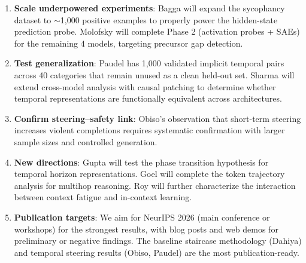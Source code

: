 \documentclass[midterm]{sparreport}
\begin{document}
\begin{enumerate}
  \item \textbf{Scale underpowered experiments}: Bagga will expand the sycophancy dataset to $\sim$1,000 positive examples to properly power the hidden-state prediction probe. Molofsky will complete Phase 2 (activation probes + SAEs) for the remaining 4 models, targeting precursor gap detection.

  \item \textbf{Test generalization}: Paudel has 1,000 validated implicit temporal pairs across 40 categories that remain unused as a clean held-out set. Sharma will extend cross-model analysis with causal patching to determine whether temporal representations are functionally equivalent across architectures.

  \item \textbf{Confirm steering--safety link}: Obiso's observation that short-term steering increases violent completions requires systematic confirmation with larger sample sizes and controlled generation.

  \item \textbf{New directions}: Gupta will test the phase transition hypothesis for temporal horizon representations. Goel will complete the token trajectory analysis for multihop reasoning. Roy will further characterize the interaction between context fatigue and in-context learning.

  \item \textbf{Publication targets}: We aim for NeurIPS 2026 (main conference or workshops) for the strongest results, with blog posts and web demos for preliminary or negative findings. The baseline staircase methodology (Dahiya) and temporal steering results (Obiso, Paudel) are the most publication-ready.
\end{enumerate}



\end{document}
